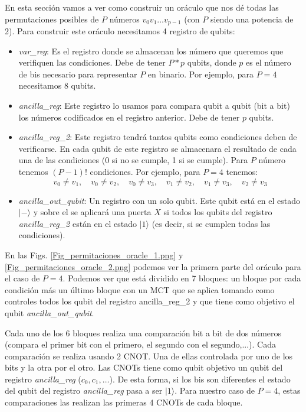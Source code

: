 \documentclass[a4paper,11pt]{article} %
\numberwithin{equation}{section}
\begin{document}
En esta sección vamos a ver como construir un oráculo que nos dé todas las permutaciones posibles de $P$ números $v_0v_1 \dots v_{p-1}$ (con $P$ siendo una potencia de 2). Para construir este oráculo necesitamos 4 registro de qubits:
\begin{itemize}
	\item \textit{var\_reg}: Es el registro donde se almacenan los número que queremos que verifiquen las condiciones. Debe de tener $P*p$ qubits, donde $p$ es el número de bis necesario para representar $P$ en binario. Por ejemplo, para $P=4$ necesitamos 8 qubits.
	
	\item \textit{ancilla\_reg}: Este registro lo usamos para compara qubit a qubit (bit a bit) los números codificados en el registro anterior. Debe de tener $p$ qubits.
	
	\item \textit{ancilla\_reg\_2}: Este registro tendrá tantos qubits como condiciones deben de verificarse. En cada qubit de este registro se almacenara el resultado de cada una de las condiciones (0 si no se cumple, 1 si se cumple). Para $P$ número tenemos $(P-1)!$ condiciones. Por ejemplo, para $P=4$ tenemos:
	$$
	v_0 \neq v_1, \quad v_0 \neq v_2, \quad v_0 \neq v_3, \quad v_1 \neq v_2, \quad v_1 \neq v_3, \quad v_2 \neq v_3
	$$
	
	\item \textit{ancilla\_out\_qubit}: Un registro con un solo qubit. Este qubit está en el estado $|-\rangle$ y sobre el se aplicará una puerta $X$ si todos los qubits del registro \textit{ancilla\_reg\_2} están en el estado $|1 \rangle$ (es decir, si se cumplen todas las condiciones).
\end{itemize}

En las Figs. \ref{Fig_permitaciones_oracle_1.png} y \ref{Fig_permitaciones_oracle_2.png} podemos ver la primera parte del oráculo para el caso de $P=4$.  Podemos ver que está dividido en 7 bloques: un bloque por cada condición más un último bloque con un MCT que se aplica tomando como controles todos los qubit del registro {ancilla\_reg\_2} y que tiene como objetivo el qubit \textit{ancilla\_out\_qubit}. 

Cada uno de los 6 bloques realiza una comparación bit a bit de dos números (compara el primer bit con el primero, el segundo con el segundo,...). Cada comparación se realiza usando 2 CNOT. Una de ellas controlada por uno de los bits y la otra por el otro. Las CNOTs tiene como qubit objetivo un qubit del registro \textit{ancilla\_reg} ($c_0, c_1, \dots$). De esta forma, si los bis son diferentes el estado del qubit del registro \textit{ancilla\_reg} pasa a ser $|1\rangle$. Para nuestro caso de $P=4$, estas comparaciones las realizan las primeras 4 CNOTs de cada bloque.
\end{document}
